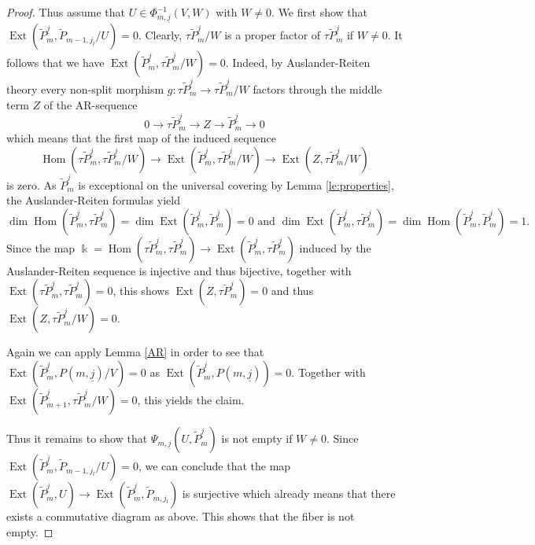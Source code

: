 \documentclass{amsart}
\newcommand{\uj}{\underline j}
\newcommand{\kk}{\Bbbk}
\newcommand{\Ext}{\operatorname{Ext}}
\newcommand{\Hom}{\operatorname{Hom}}
\newcommand{\ses}[3]{0\rightarrow #1\rightarrow #2\rightarrow#3\rightarrow 0}
\begin{document}
\begin{proof}
Thus assume that $U\in\Phi_{m,\uj}^{-1}(V,W)$ with $W\neq 0$. We first show that $\Ext(\tilde P_{m}^{\uj},\tilde P_{m-1,j_l}/U)= 0$. Clearly, $\tau\tilde P_{m}^{\uj}/W$ is a proper factor of $\tau \tilde P_{m}^{\uj}$ if $W\neq 0$. 
It follows that we have $\Ext(\tilde P_{m}^{\uj},\tau\tilde P_{m}^{\uj}/W)=0$. Indeed, by Auslander-Reiten theory every non-split morphism $g:\tau\tilde P_{m}^{\uj}\to \tau\tilde P_{m}^{\uj}/W$ factors through the middle term $Z$ of the AR-sequence 
\[\ses{\tau\tilde P_{m}^{\uj}}{Z}{\tilde P_{m}^{\uj}}\]
which means that the first map of the induced sequence
\[\Hom(\tau\tilde P_{m}^{\uj},\tau\tilde P_{m}^{\uj}/W)\to\Ext(\tilde P_{m}^{\uj},\tau\tilde P_{m}^{\uj}/W)\to\Ext(Z,\tau\tilde P_{m}^{\uj}/W) \]
is zero. As $\tilde P_m^{\uj}$ is exceptional on the universal covering by Lemma \ref{le:properties}, the Auslander-Reiten formulas \cite[Theorem IV.2.13]{ass} yield  
$$\dim\Hom(\tilde P_{m}^{\uj},\tau \tilde P_{m}^{\uj})=\dim\Ext(\tilde P_{m}^{\uj},\tilde P_{m}^{\uj})=0 \text{ and } \dim\Ext(\tilde P_m^{\uj},\tau\tilde P_m^{j})=\dim\Hom(\tilde P_{m}^{\uj},\tilde P_{m}^{\uj})=1.$$ Since the map $\kk=\Hom(\tau \tilde P_{m}^{\uj},\tau \tilde P_{m}^{\uj})\to\Ext(\tilde P_{m}^{\uj},\tau \tilde P_{m}^{\uj})$ induced by the Auslander-Reiten sequence is injective and thus bijective, together with $\Ext(\tau \tilde P_{m}^{\uj},\tau \tilde P_{m}^{\uj})=0$, this shows $\Ext(Z,\tau\tilde P_{m}^{\uj})=0$ and thus $\Ext(Z,\tau\tilde P_{m}^{\uj}/W)=0$.



Again we can apply Lemma \ref{AR} in order to see that $\Ext(\tilde P_{m}^{\uj},P(m,\uj)/V)=0$ as $\Ext(\tilde P_{m}^{\uj},P(m,\uj))=0$. 
 Together with $\Ext(\tilde P_{m+1}^{\uj},\tau\tilde P_{m}^{\uj}/W)=0$, this yields the claim.

Thus it remains to show that $\Psi_{m,\uj}(U,\tilde P_{m}^{\uj})$ is not empty if $W\neq 0$. Since $\Ext(\tilde P_{m}^{\uj},\tilde P_{m-1,j_l}/U)= 0$, we can conclude that the map $\Ext(\tilde P_{m}^{\uj},U)\to\Ext(\tilde P_{m}^{\uj},\tilde P_{m,j_l})$ is surjective which already means that there exists a commutative diagram as above. This shows that the fiber is not empty.
\end{proof}
\end{document}
